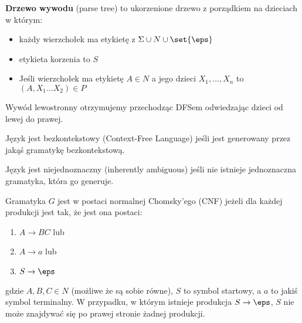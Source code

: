 \begin{definition}
    \textbf{Drzewo wywodu} (parse tree) to ukorzenione drzewo z porządkiem na dzieciach w którym:
    \begin{itemize}
        \item każdy wierzchołek ma etykietę z \( \Sigma \cup N \cup \set{\eps} \)
        \item etykieta korzenia to \( S \)
        \item Jeśli wierzchołek ma etykietę \( A \in N \) a jego dzieci \( X_1, \dots, X_n \) to \( (A, X_1\dots X_2) \in P \)
    \end{itemize}
\end{definition}
Wywód lewostronny otrzymujemy przechodząc DFSem odwiedzając dzieci od lewej do prawej.

\begin{definition}
    Język jest bezkontekstowy (Context-Free Language) jeśli jest generowany przez jakąś gramatykę bezkontekstową.
\end{definition}
\begin{definition}
    Język jest niejednoznaczny (inherently ambiguous) jeśli nie istnieje jednoznaczna gramatyka, która go generuje.
\end{definition}
\begin{definition}
    Gramatyka $G$ jest w postaci normalnej Chomsky'ego (CNF) jeżeli dla każdej produkcji jest tak, że jest ona postaci:
    
    \begin{enumerate}
        \item \(A \rightarrow BC\) lub 
        \item \(A \rightarrow a\) lub
        \item \(S \rightarrow \eps\) 
    \end{enumerate}
    
    gdzie \(A,B,C \in N\) (możliwe że są sobie równe), \(S\) to symbol startowy, a \(a\) to jakiś symbol terminalny. W przypadku, w którym istnieje produkcja \(S \rightarrow \eps\), \(S\) nie może znajdywać się po prawej stronie żadnej produkcji. 
\end{definition}